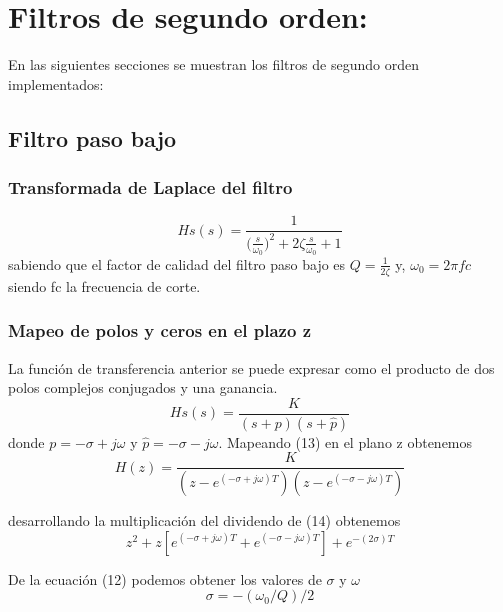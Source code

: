 \documentclass[titlepage]{article}
\begin{document}
\section{Filtros de segundo orden:}
En las siguientes secciones se muestran los filtros de segundo orden implementados:
\subsection{Filtro paso bajo}
\subsubsection{Transformada de Laplace del filtro}
\begin{equation}
Hs(s)=\frac{1}{\displaystyle{(\frac{s}{\omega_0}})^2+2\zeta\frac{s}{\omega_0}+1}
\end{equation}
sabiendo que el factor de calidad del filtro paso bajo es $Q=\displaystyle\frac{1}{2\zeta}$ y, $\omega_0=2{\pi}fc$ siendo fc la frecuencia de corte.
\subsubsection{Mapeo de polos y ceros en el plazo z}
La función de transferencia anterior se puede expresar como el producto de dos polos complejos conjugados y una ganancia.  
\begin{equation}
Hs(s)=\frac{K}{\displaystyle(s+p)(s+\hat{p})}
\end{equation}
donde  $p=-\sigma+j\omega$ y $\hat{p}=-\sigma-j\omega$.
Mapeando (13) en el plano z obtenemos
\begin{equation}
H(z)=\frac{K}{\displaystyle(z-e^{(-\sigma+j\omega)T})(z-e^{(-\sigma-j\omega)T})}
\end{equation}

desarrollando la multiplicación del dividendo de (14) obtenemos
\begin{equation}
z^2+z[e^{(-\sigma+j\omega)T}+e^{(-\sigma-j\omega)T}]+e^{-(2\sigma)T}  
\end{equation}


De la ecuación (12) podemos obtener los valores de $\sigma$ y $\omega$
\begin{equation}
\sigma=-(\omega_0/Q)/2
\end{equation}
\end{document}
